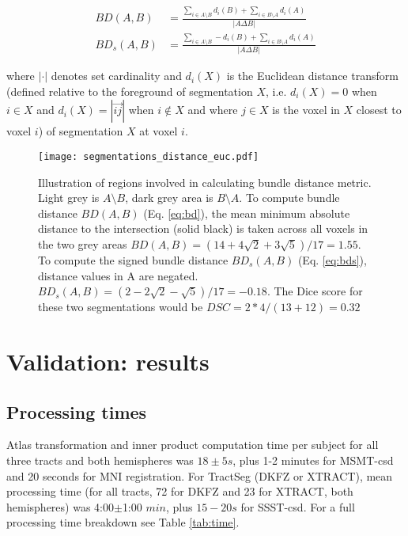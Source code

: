 \begin{align}
  BD(A,B) &= \frac{\sum_{i \in A\setminus B} d_i(B) + \sum_{i \in B\setminus A} d_i(A)}{|A\Delta B|} \label{eq:bd} \\
  BD_s(A,B) &= \frac{\sum_{i \in A\setminus B} - d_i(B) + \sum_{i \in B\setminus A} d_i(A)}{|A\Delta B|} \label{eq:bds}
\end{align}

where $| \cdot |$ denotes set cardinality and $d_i(X)$ is the Euclidean distance transform (defined relative to the foreground of segmentation $X$, i.e. $d_i(X) = 0$ when $i \in X $ and $d_i(X) = |\overrightarrow{ij}|$ when $i \not\in X$ and where $j \in X$ is the voxel in $X$ closest to voxel $i$)  of segmentation $X$ at voxel $i$.

\begin{SCfigure}[50][htbp!]
  \centering
  \texttt{[image: segmentations\_distance\_euc.pdf]}
  \caption{Illustration of regions involved in calculating bundle distance metric. Light grey is $A\setminus B$, dark grey area is $B\setminus A$. To compute bundle distance $BD(A,B)$ (Eq. \ref{eq:bd}), the mean minimum absolute distance to the intersection (solid black) is taken across all voxels in the two grey areas $BD(A,B) = (14+4\sqrt{2}+3\sqrt{5})/17 = 1.55$. To compute the signed bundle distance $BD_s(A,B)$ (Eq. \ref{eq:bds}), distance values in A are negated. $BD_s(A,B) = (2-2\sqrt{2}-\sqrt{5})/17 = -0.18$. The Dice score for these two segmentations would be $DSC = 2*4/(13+12) = 0.32$}
  \label{fig:BD}
\end{SCfigure}

\section{Validation: results}
\label{sec:validation}

\subsection{Processing times}

Atlas transformation and inner product computation time per subject for all three tracts and both hemispheres was $18\pm5 s$, plus 1-2 minutes for MSMT-\gls{csd} and 20 seconds for MNI registration.
For TractSeg (DKFZ or XTRACT), mean processing time (for all tracts, 72 for DKFZ and 23 for XTRACT, both hemispheres) was 4:00$\pm$1:00 $min$, plus $15-20 s$ for SSST-\gls{csd}.
For a full processing time breakdown see Table \ref{tab:time}.

